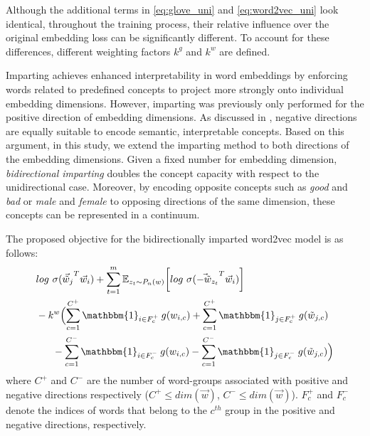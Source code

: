 \documentclass[11pt,a4paper]{article}
\newcommand{\indicator}{\ensuremath{\mathbbm{1}}}
\begin{document}
Although the additional terms in \eqref{eq:glove_uni} and \eqref{eq:word2vec_uni} look identical, throughout the training process, their relative influence over the original embedding loss can be significantly different. To account for these differences, different weighting factors $k^g$ and $k^w$ are defined.  

Imparting achieves enhanced interpretability in word embeddings by enforcing words related to predefined concepts to project more strongly onto individual embedding dimensions. However, imparting was previously only performed for the positive direction of embedding dimensions. As discussed in \citep{senel18semanticStructure}, negative directions are equally suitable to encode semantic, interpretable concepts. Based on this argument, in this study, we extend the imparting method to both directions of the embedding dimensions. 
Given a fixed number for embedding dimension, \textit{bidirectional imparting} doubles the concept capacity with respect to the unidirectional case. Moreover, by encoding opposite concepts such as \textit{good} and \textit{bad} or \textit{male} and \textit{female} to opposing directions of the same dimension, these concepts can be represented in a continuum.

The proposed objective for the bidirectionally imparted word2vec model is as follows:
\begin{align}
\begin{split}
& log ~ \sigma ({\vec{\tilde{w}}_{j}}^T \vec{w}_{i}) + \sum_{t = 1}^{m} {\mathbb{E}}_{z_t \sim P_n(w)} \bigg[ log ~ \sigma({\vec{-\tilde{w}}_{z_t}}^T \vec{w}_{i}) \bigg] \\ 
& -k^w \Bigl(  \sum_{c=1}^{C^+} \indicator_{i\in{}F^+_c} \: g(w_{i,c}) + \sum_{c=1}^{C^+} \indicator_{j \in F^+_c} \: g(\tilde{w}_{j,c}) \\
& ~~~~~ - \sum_{c=1}^{C^-} \indicator_{i\in{}F^-_c} \: g(w_{i,c}) - \sum_{c=1}^{C^-} \indicator_{j \in F^-_c} \: g(\tilde{w}_{j,c}) \Bigr)
\end{split}
\label{eq:word2vec_bi}
\end{align}
where $C^+$ and $C^-$ are the number of word-groups associated with positive and negative directions respectively ($C^+ \leq dim(\vec{w})$, $C^- \leq dim(\vec{w})$). $F^+_c$ and $F^-_c$ denote the indices of words that belong to the $c^{th}$ group in the positive and negative directions, respectively. 
\end{document}
